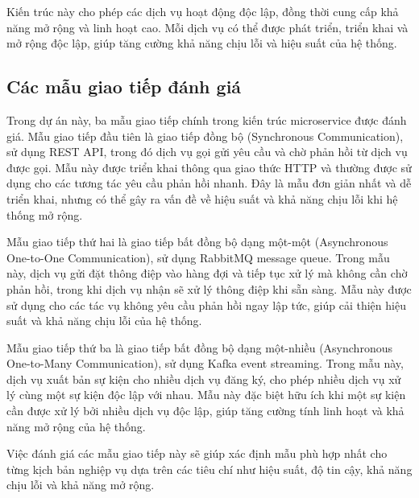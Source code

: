 Kiến trúc này cho phép các dịch vụ hoạt động độc lập, đồng thời cung cấp khả năng mở rộng và linh hoạt cao. Mỗi dịch vụ có thể được phát triển, triển khai và mở rộng độc lập, giúp tăng cường khả năng chịu lỗi và hiệu suất của hệ thống.

\subsection{Các mẫu giao tiếp đánh giá}
Trong dự án này, ba mẫu giao tiếp chính trong kiến trúc microservice được đánh giá. Mẫu giao tiếp đầu tiên là giao tiếp đồng bộ (Synchronous Communication), sử dụng REST API, trong đó dịch vụ gọi gửi yêu cầu và chờ phản hồi từ dịch vụ được gọi. Mẫu này được triển khai thông qua giao thức HTTP và thường được sử dụng cho các tương tác yêu cầu phản hồi nhanh. Đây là mẫu đơn giản nhất và dễ triển khai, nhưng có thể gây ra vấn đề về hiệu suất và khả năng chịu lỗi khi hệ thống mở rộng.

Mẫu giao tiếp thứ hai là giao tiếp bất đồng bộ dạng một-một (Asynchronous One-to-One Communication), sử dụng RabbitMQ message queue. Trong mẫu này, dịch vụ gửi đặt thông điệp vào hàng đợi và tiếp tục xử lý mà không cần chờ phản hồi, trong khi dịch vụ nhận sẽ xử lý thông điệp khi sẵn sàng. Mẫu này được sử dụng cho các tác vụ không yêu cầu phản hồi ngay lập tức, giúp cải thiện hiệu suất và khả năng chịu lỗi của hệ thống.

Mẫu giao tiếp thứ ba là giao tiếp bất đồng bộ dạng một-nhiều (Asynchronous One-to-Many Communication), sử dụng Kafka event streaming. Trong mẫu này, dịch vụ xuất bản sự kiện cho nhiều dịch vụ đăng ký, cho phép nhiều dịch vụ xử lý cùng một sự kiện độc lập với nhau. Mẫu này đặc biệt hữu ích khi một sự kiện cần được xử lý bởi nhiều dịch vụ độc lập, giúp tăng cường tính linh hoạt và khả năng mở rộng của hệ thống.

Việc đánh giá các mẫu giao tiếp này sẽ giúp xác định mẫu phù hợp nhất cho từng kịch bản nghiệp vụ dựa trên các tiêu chí như hiệu suất, độ tin cậy, khả năng chịu lỗi và khả năng mở rộng.